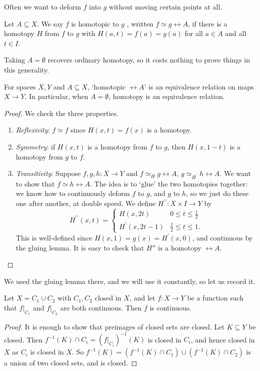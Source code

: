 Often we want to deform $f$ into $g$ without moving certain points at all.

\begin{definition}
	Let $A \subseteq X$. We say $f$ is homotopic to $g$ , written $f \simeq g \rel A$, if there is a homotopy $H$ from $f$ to $g$ with $H(a, t) = f(a) = g(a)$ for all $a \in A$ and all $t \in I$.
\end{definition}

Taking $A = \emptyset$ recovers ordinary homotopy, so it costs nothing to prove things in
this generality.

\begin{proposition}
	For spaces $X, Y$ and $A \subseteq X$, `homotopic $\rel A$' is an equivalence relation on maps $X \to Y$. In particular, when $A = \emptyset$, homotopy is an equivalence relation.
\end{proposition}
\begin{proof}
	We check the three properties.
	\begin{enumerate}
		\item \emph{Reflexivity}: $f \simeq f$ since $H(x, t)=f(x)$ is a homotopy.
		\item \emph{Symmetry}: if $H(x, t)$ is a homotopy from $f$ to $g$, then $H(x, 1-t)$ is a homotopy from $g$ to $f$.
		\item \emph{Transitivity}: Suppose $f, g, h: X \rightarrow Y$ and $f \simeq_H g \rel A$, $g \simeq_{H^{\prime}} h \rel A$. We want to show that $f \simeq h \rel A$. The idea is to `glue' the two homotopies together: we know how to continuously deform $f$ to $g$, and $g$ to $h$, so we just do these one after another, at double speed. We define $H^{\prime \prime}: X \times I \rightarrow Y$ by
		$$
		H^{\prime \prime}(x, t)= \begin{cases}H(x, 2 t) & 0 \leq t \leq \frac{1}{2} \\ H^{\prime}(x, 2 t-1) & \frac{1}{2} \leq t \leq 1.\end{cases}
		$$
		This is well-defined since $H(x, 1)=g(x)=H^{\prime}(x, 0)$, and continuous by the gluing lemma. It is easy to check that $H''$ is a homotopy $\rel A$. \qedhere
	\end{enumerate}
\end{proof}

We used the gluing lemma there, and we will use it constantly, so let us record it.

\begin{lemma}
	Let $X = C_1 \cup C_2$ with $C_1, C_2$ closed in $X$, and let $f: X \to Y$ be a function such that $f|_{C_1}$ and $f|_{C_2}$ are both continuous. Then $f$ is continuous.
\end{lemma}
\begin{proof}
	It is enough to show that preimages of closed sets are closed. Let $K \subseteq Y$ be closed. Then $f^{-1}(K) \cap C_i = (f|_{C_i})^{-1}(K)$ is closed in $C_i$, and hence closed in $X$ as $C_i$ is closed in $X$. So $f^{-1}(K) = (f^{-1}(K) \cap C_1) \cup (f^{-1}(K) \cap C_2)$ is a union of two closed sets, and is closed.
\end{proof}

